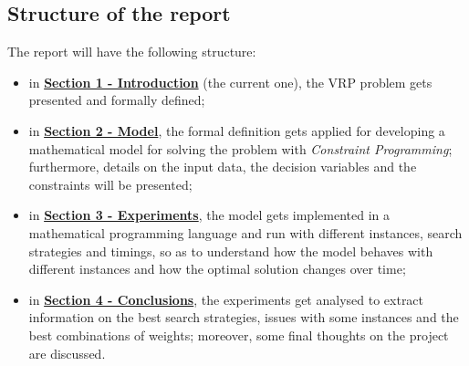 \documentclass[../main.tex]{subfiles}
\begin{document}
\subsection{Structure of the report}
\label{subsec:structure-report}
The report will have the following structure:
\begin{itemize}
    \item in \textbf{\hyperref[sec:introduction]{Section 1 - Introduction}} (the current one), the VRP problem gets presented and formally defined;
    \item in \textbf{\hyperref[sec:model]{Section 2 - Model}}, the formal definition gets applied for developing a mathematical model for solving the problem with \textit{Constraint Programming}; furthermore, details on the input data, the decision variables and the constraints will be presented;
    \item in \textbf{\hyperref[sec:experiments]{Section 3 - Experiments}}, the model gets implemented in a mathematical programming language and run with different instances, search strategies and timings, so as to understand how the model behaves with different instances and how the optimal solution changes over time;
    \item in \textbf{\hyperref[sec:conclusions]{Section 4 - Conclusions}}, the experiments get analysed to extract information on the best search strategies, issues with some instances and the best combinations of weights; moreover, some final thoughts on the project are discussed.
\end{itemize}
\end{document}
